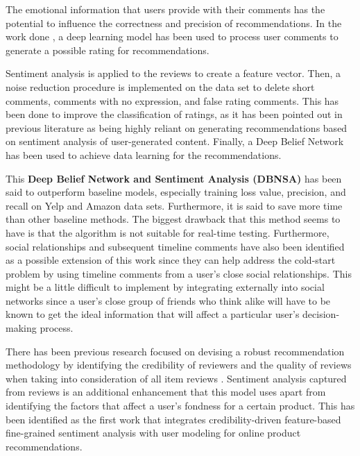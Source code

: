 \documentclass[manuscript,screen,review]{acmart}
\begin{document}
The emotional information that users provide with their comments has the potential to influence the correctness and precision of recommendations. In the work done \cite{chen_user_2019}, a deep learning model has been used to process user comments to generate a possible rating for recommendations.

Sentiment analysis is applied to the reviews to create a feature vector. Then, a noise reduction procedure is implemented on the data set to delete short comments, comments with no expression, and false rating comments. This has been done to improve the classification of ratings, as it has been pointed out in previous literature\cite{cheng_hybrid_2020} as being highly reliant on generating recommendations based on sentiment analysis of user-generated content. Finally, a Deep Belief Network has been used to achieve data learning for the recommendations.

This \textbf{Deep Belief Network and Sentiment Analysis (DBNSA)} has been said to outperform baseline models, especially training loss value, precision, and recall on Yelp and Amazon data sets. Furthermore, it is said to save more time than other baseline methods. The biggest drawback that this method seems to have is that the algorithm is not suitable for real-time testing.
Furthermore, social relationships and subsequent timeline comments have also been identified as a possible extension of this work since they can help address the cold-start problem by using timeline comments from a user's close social relationships. This might be a little difficult to implement by integrating externally into social networks since a user's close group of friends who think alike will have to be known to get the ideal information that will affect a particular user's decision-making process.

\bigbreak

There has been previous research focused on devising a robust recommendation methodology by identifying the credibility of reviewers and the quality of reviews when taking into consideration of all item reviews \cite{hu_reviewer_2020}. Sentiment analysis captured from reviews is an additional enhancement that this model uses apart from identifying the factors that affect a user's fondness for a certain product. This has been identified as the first work that integrates credibility-driven feature-based fine-grained sentiment analysis with user modeling for online product recommendations.
\end{document}
